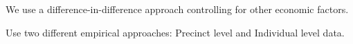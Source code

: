 \documentclass[12pt,a4paper]{article}
\begin{document}
We use a difference-in-difference approach controlling for other economic factors. 

Use two different empirical approaches: Precinct level and Individual level data.





\end{document}

